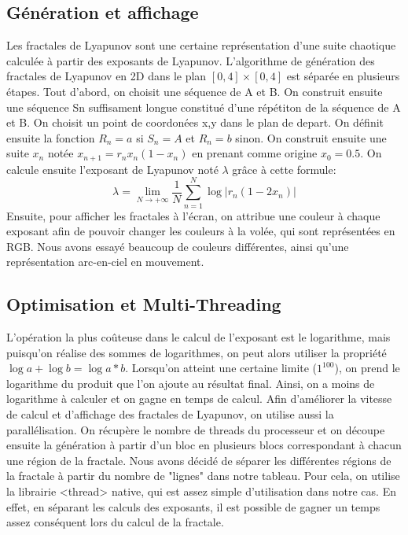 \documentclass{article}
\begin{document}
	\subsection{Génération et affichage}
	Les fractales de Lyapunov sont une certaine représentation d'une suite chaotique calculée à partir des exposants de Lyapunov.
	L'algorithme de génération des fractales de Lyapunov en 2D dans le plan $[0,4] \times [0,4]$ est séparée en plusieurs étapes.
	Tout d'abord, on choisit une séquence de A et B.
	On construit ensuite une séquence Sn suffisament longue constitué d'une répétiton de la séquence de A et B.
	On choisit un point de coordonées x,y dans le plan de depart.
	On définit ensuite la fonction $R_n = a$ si $ S_n = A $ et $R_n = b$ sinon.
	On construit ensuite une suite $x_n$ notée $x_{{n+1}}=r_{n}x_{n}(1-x_{n})$ en prenant comme origine $x_0 = 0.5$.
	On calcule ensuite l'exposant de Lyapunov noté $\lambda$ grâce à cette formule:
	\[
		\lambda = \lim_{N \to +\infty} \frac{1}{N} \sum_{n=1}^{N} \log | r_n(1-2x_n) |
	\]
	Ensuite, pour afficher les fractales à l'écran, on attribue une couleur à chaque exposant afin de pouvoir changer les couleurs à la volée, qui sont représentées en RGB.
	Nous avons essayé beaucoup de couleurs différentes, ainsi qu'une représentation arc-en-ciel en mouvement.

	\subsection{Optimisation et Multi-Threading}

	L'opération la plus coûteuse dans le calcul de l'exposant est le logarithme, mais puisqu'on réalise des sommes de logarithmes, on peut alors utiliser la propriété $\log{a} + \log{b} = \log{a * b}$.
	Lorsqu'on atteint une certaine limite ($1^{100}$), on prend le logarithme du produit que l'on ajoute au résultat final.
	Ainsi, on a moins de logarithme à calculer et on gagne en temps de calcul.
	Afin d'améliorer la vitesse de calcul et d'affichage des fractales de Lyapunov, on utilise aussi la parallélisation.
	On récupère le nombre de threads du processeur et on découpe ensuite la génération à partir d'un bloc en plusieurs blocs correspondant à chacun une région de la fractale.
	Nous avons décidé de séparer les différentes régions de la fractale à partir du nombre de "lignes" dans notre tableau.
	Pour cela, on utilise la librairie <thread> native, qui est assez simple d'utilisation dans notre cas.
	En effet, en séparant les calculs des exposants, il est possible de gagner un temps assez conséquent lors du calcul de la fractale.
\end{document}
